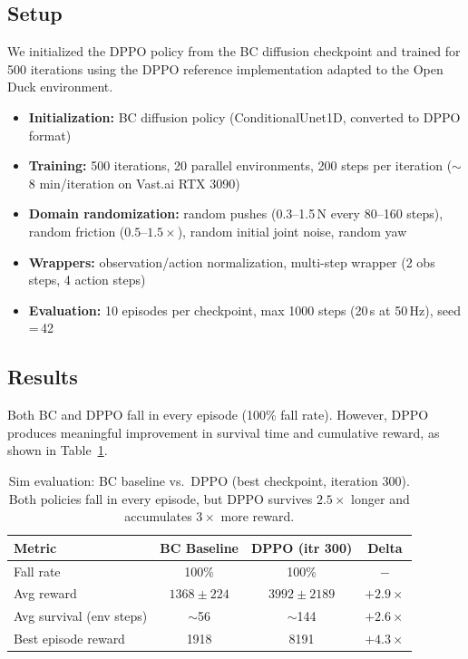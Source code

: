 \documentclass{article}
\begin{document}
\subsection{Setup}

We initialized the DPPO policy from the BC diffusion checkpoint and trained for 500 iterations using the DPPO reference implementation adapted to the Open Duck environment.

\begin{itemize}[nosep]
  \item \textbf{Initialization:} BC diffusion policy (ConditionalUnet1D, converted to DPPO format)
  \item \textbf{Training:} 500 iterations, 20 parallel environments, 200 steps per iteration ($\sim$8 min/iteration on Vast.ai RTX 3090)
  \item \textbf{Domain randomization:} random pushes (0.3--1.5\,N every 80--160 steps), random friction ($0.5\text{--}1.5\times$), random initial joint noise, random yaw
  \item \textbf{Wrappers:} observation/action normalization, multi-step wrapper (2 obs steps, 4 action steps)
  \item \textbf{Evaluation:} 10 episodes per checkpoint, max 1000 steps (20\,s at 50\,Hz), seed\,=\,42
\end{itemize}

\subsection{Results}

Both BC and DPPO fall in every episode (100\% fall rate). However, DPPO produces meaningful improvement in survival time and cumulative reward, as shown in Table~\ref{tab:dppo_results}.

\begin{table}[t]
\caption{Sim evaluation: BC baseline vs.\ DPPO (best checkpoint, iteration 300). Both policies fall in every episode, but DPPO survives $2.5\times$ longer and accumulates $3\times$ more reward.}
\label{tab:dppo_results}
\centering
\begin{tabular}{lccc}
\toprule
Metric & BC Baseline & DPPO (itr 300) & Delta \\
\midrule
Fall rate & 100\% & 100\% & $-$ \\
Avg reward & $1368 \pm 224$ & $3992 \pm 2189$ & $+2.9\times$ \\
Avg survival (env steps) & $\sim$56 & $\sim$144 & $+2.6\times$ \\
Best episode reward & 1918 & 8191 & $+4.3\times$ \\
\bottomrule
\end{tabular}
\end{table}
\end{document}
